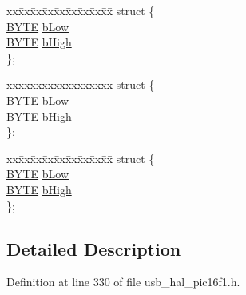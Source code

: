 \begin{DoxyCompactItemize}
\begin{tabbing}
\end{tabbing}\item 
\begin{tabbing}
xx\=xx\=xx\=xx\=xx\=xx\=xx\=xx\=xx\=\kill
struct \{\\
\>\hyperlink{_generic_type_defs_8h_a4ae1dab0fb4b072a66584546209e7d58}{BYTE} \hyperlink{union___p_o_i_n_t_e_r_a072a7dd91588708091200278cf02b094}{bLow}\\
\>\hyperlink{_generic_type_defs_8h_a4ae1dab0fb4b072a66584546209e7d58}{BYTE} \hyperlink{union___p_o_i_n_t_e_r_a8e2d6813fd08f41226f10f65c05ffe7b}{bHigh}\\
\}; \\

\end{tabbing}\item 
\begin{tabbing}
xx\=xx\=xx\=xx\=xx\=xx\=xx\=xx\=xx\=\kill
struct \{\\
\>\hyperlink{_generic_type_defs_8h_a4ae1dab0fb4b072a66584546209e7d58}{BYTE} \hyperlink{union___p_o_i_n_t_e_r_a072a7dd91588708091200278cf02b094}{bLow}\\
\>\hyperlink{_generic_type_defs_8h_a4ae1dab0fb4b072a66584546209e7d58}{BYTE} \hyperlink{union___p_o_i_n_t_e_r_a8e2d6813fd08f41226f10f65c05ffe7b}{bHigh}\\
\}; \\

\end{tabbing}\item 
\begin{tabbing}
xx\=xx\=xx\=xx\=xx\=xx\=xx\=xx\=xx\=\kill
struct \{\\
\>\hyperlink{_generic_type_defs_8h_a4ae1dab0fb4b072a66584546209e7d58}{BYTE} \hyperlink{union___p_o_i_n_t_e_r_a072a7dd91588708091200278cf02b094}{bLow}\\
\>\hyperlink{_generic_type_defs_8h_a4ae1dab0fb4b072a66584546209e7d58}{BYTE} \hyperlink{union___p_o_i_n_t_e_r_a8e2d6813fd08f41226f10f65c05ffe7b}{bHigh}\\
\}; \\

\end{tabbing}\end{DoxyCompactItemize}


\subsection{Detailed Description}


Definition at line 330 of file usb\+\_\+hal\+\_\+pic16f1.\+h.



